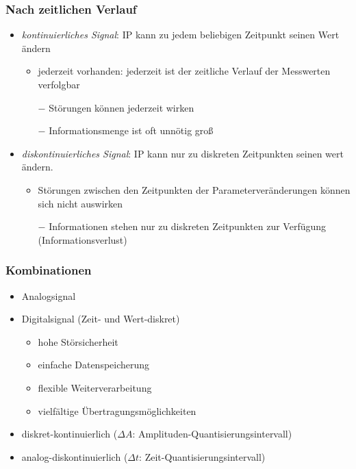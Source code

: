 \subsubsection{Nach zeitlichen Verlauf}
\begin{itemize}
\item \emph{kontinuierliches Signal}: IP kann zu jedem beliebigen Zeitpunkt seinen Wert ändern
\begin{itemize}[label=$+$]
\item jederzeit vorhanden: jederzeit ist der zeitliche Verlauf der Messwerten verfolgbar
\item[$-$] Störungen können jederzeit wirken
\item[$-$] Informationsmenge ist oft unnötig groß
\end{itemize}
\item \emph{diskontinuierliches Signal}: IP kann nur zu diskreten Zeitpunkten seinen wert ändern.
\begin{itemize}[label=$+$]
\item Störungen zwischen den Zeitpunkten der Parameterveränderungen können sich nicht auswirken
\item[$-$] Informationen stehen nur zu diskreten Zeitpunkten zur Verfügung (Informationsverlust)
\end{itemize}
\end{itemize}
\subsubsection{Kombinationen}
\begin{itemize}
\item Analogsignal
\item Digitalsignal (Zeit- und Wert-diskret)
\begin{itemize}[label=$+$]
\item hohe Störsicherheit
\item einfache Datenspeicherung
\item flexible Weiterverarbeitung
\item vielfältige Übertragungsmöglichkeiten
\end{itemize}
\item diskret-kontinuierlich ($\Delta A$: Amplituden-Quantisierungsintervall)
\item analog-diskontinuierlich ($\Delta t$: Zeit-Quantisierungsintervall)
\end{itemize}


